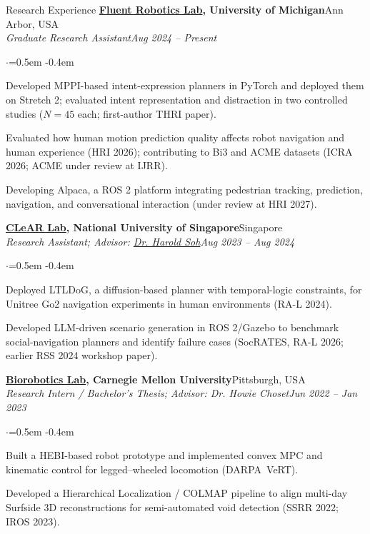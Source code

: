 \documentclass{resume}
\renewenvironment{rSubsection}[4]{%
 \Needspace{4\baselineskip}%
 {\bf #1}\hfill #2\\
 {\em #3}\hfill {\em #4}\smallskip
 \begin{list}{$\cdot$}{\leftmargin=0pt\itemindent=0pt\listparindent=0pt\labelsep=0.5em}%
 \itemsep -0.4em\vspace{-0.5em}%
}{\end{list}\vspace{0.15em}}
\begin{document}
\begin{rSection}{Research Experience}
\begin{rSubsection}{\href{https://fluentrobotics.com/}{Fluent Robotics Lab}, University of Michigan}{Ann Arbor, USA}{Graduate Research Assistant}{Aug 2024 -- Present}
\item Developed MPPI-based intent-expression planners in PyTorch and deployed them on Stretch 2; evaluated intent representation and distraction in two controlled studies ($N=45$ each; first-author THRI paper).
\item Evaluated how human motion prediction quality affects robot navigation and human experience (HRI 2026); contributing to Bi3 and ACME datasets (ICRA 2026; ACME under review at IJRR).
\item Developing Alpaca, a ROS 2 platform integrating pedestrian tracking, prediction, navigation, and conversational interaction (under review at HRI 2027).
\end{rSubsection}

\begin{rSubsection}{\href{https://clear-nus.github.io/}{CLeAR Lab}, National University of Singapore}{Singapore}{Research Assistant; Advisor: \href{https://haroldsoh.com/}{Dr. Harold Soh}}{Aug 2023 -- Aug 2024}
\item Deployed LTLDoG, a diffusion-based planner with temporal-logic constraints, for Unitree Go2 navigation experiments in human environments (RA-L 2024).
\item Developed LLM-driven scenario generation in ROS 2/Gazebo to benchmark social-navigation planners and identify failure cases (SocRATES, RA-L 2026; earlier RSS 2024 workshop paper).
\end{rSubsection}

\begin{rSubsection}{\href{https://biorobotics.ri.cmu.edu/}{Biorobotics Lab}, Carnegie Mellon University}{Pittsburgh, USA}{Research Intern / Bachelor's Thesis; Advisor: Dr. Howie Choset}{Jun 2022 -- Jan 2023}
\item Built a HEBI-based robot prototype and implemented convex MPC and kinematic control for legged--wheeled locomotion (DARPA~VeRT).
\item Developed a Hierarchical Localization / COLMAP pipeline to align multi-day Surfside 3D reconstructions for semi-automated void detection (SSRR 2022; IROS 2023).
\end{rSubsection}
\end{rSection}
\end{document}

